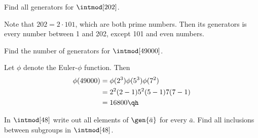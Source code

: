 \begin{exercise}\label{ex2.3.4}
    Find all generators for $\intmod[202]$.
\end{exercise}

\begin{sol}
    Note that $202 = 2 \cdot 101$, which are both prime numbers. Then its generators is every number between 1 and 202, except 101 and even numbers.
\end{sol}

\begin{exercise}\label{ex2.3.5}
    Find the number of generators for $\intmod[49000]$.
\end{exercise}

\begin{sol}
    Let $\phi$ denote the Euler-$\phi$ function. Then
    \begin{align*}
        \phi(49000) & = \phi(2^3)\phi(5^3)\phi(7^2) \\
        & = 2^2(2 - 1)5^2(5 - 1)7(7 - 1) \\
        & = 16800 \qh
    \end{align*}
\end{sol}

\begin{exercise}\label{ex2.3.6}
    In $\intmod[48]$ write out all elements of $\gen{\bar a}$ for every $\bar a$. Find all inclusions between subgroups in $\intmod[48]$.
\end{exercise}

